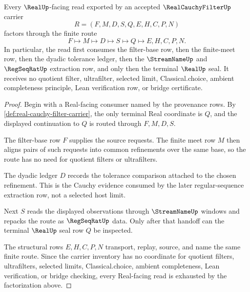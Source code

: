 \begin{theorem}
\label{thm:real-cauchy-filter-regular-sequence-handoff}
Every $\RealUp$-facing read exported by an accepted $\RealCauchyFilterUp$ carrier
$$
R=(F,M,D,S,Q,E,H,C,P,N)
$$
factors through the finite route
$$
F \longmapsto M \longmapsto D \longmapsto S \longmapsto Q \longmapsto E,H,C,P,N .
$$
In particular, the read first consumes the filter-base row, then the finite-meet row, then the dyadic tolerance ledger, then the $\StreamNameUp$ and $\RegSeqRatUp$ extraction row, and only then the terminal $\RealUp$ seal. It receives no quotient filter, ultrafilter, selected limit, Classical.choice, ambient completeness principle, Lean verification row, or bridge certificate.
\end{theorem}
\begin{proof}
Begin with a Real-facing consumer named by the provenance rows. By \autoref{def:real-cauchy-filter-carrier}, the only terminal Real coordinate is $Q$, and the displayed continuation to $Q$ is routed through $F,M,D,S$.

The filter-base row $F$ supplies the source requests. The finite meet row $M$ then aligns pairs of such requests into common refinements over the same base, so the route has no need for quotient filters or ultrafilters.

The dyadic ledger $D$ records the tolerance comparison attached to the chosen refinement. This is the Cauchy evidence consumed by the later regular-sequence extraction row, not a selected host limit.

Next $S$ reads the displayed observations through $\StreamNameUp$ windows and repacks the route as $\RegSeqRatUp$ data. Only after that handoff can the terminal $\RealUp$ seal row $Q$ be inspected.

The structural rows $E,H,C,P,N$ transport, replay, source, and name the same finite route. Since the carrier inventory has no coordinate for quotient filters, ultrafilters, selected limits, Classical.choice, ambient completeness, Lean verification, or bridge checking, every Real-facing read is exhausted by the factorization above.
\end{proof}

